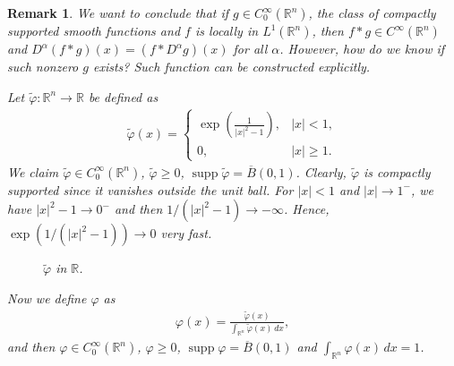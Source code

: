 \documentclass[11pt]{book}
\newtheorem{remark}{Remark}[chapter]
\theoremstyle{definition}
\numberwithin{equation}{chapter}
\begin{document}
\begin{remark}\label{remark_45}
We want to conclude that if $g \in C^\infty_0(\mathbb{R}^n)$, the class of compactly supported smooth functions and $f$ is locally in $L^1(\mathbb{R}^n)$, then $f*g \in C^\infty(\mathbb{R}^n)$ and $D^{\alpha}(f*g)(x) = \left(f*D^{\alpha}g\right)(x)$ for all $\alpha$. However, how do we know if such nonzero $g$ exists? Such function can be constructed explicitly.

Let $\widetilde{\varphi}: \mathbb{R}^n \to \mathbb{R}$ be defined as
\begin{align*}
    \widetilde{\varphi}(x) = \begin{cases}
        \exp\left(\frac{1}{\left|x\right|^2 - 1}\right), & \left|x\right| < 1, \\
        0, & \left|x\right| \geq 1.
    \end{cases}
\end{align*}
We claim $\widetilde{\varphi} \in C^\infty_0(\mathbb{R}^n)$, $\widetilde{\varphi} \geq 0$, $\operatorname{supp} \widetilde{\varphi} = \overline{B}(0,1)$. Clearly, $\widetilde{\varphi}$ is compactly supported since it vanishes outside the unit ball. For $\left|x\right| < 1$ and $\left|x\right| \to 1^-$, we have $\left|x\right|^2 - 1 \to 0^{-}$ and then $1/(\left|x\right|^2 - 1) \to -\infty$. Hence, $\exp(1/(\left|x\right|^2 - 1)) \to 0$ very fast.
\begin{figure}[H]
    \centering
    \caption{$\widetilde{\varphi}$ in $\mathbb{R}$.}
    \label{compactly_support_function_1}
\end{figure}

Now we define $\varphi$ as
\begin{align*}
    \varphi(x) = \frac{\widetilde{\varphi}(x)}{\int_{\mathbb{R}^n}\widetilde{\varphi}(x)\,dx},
\end{align*}
and then $\varphi \in C^\infty_0(\mathbb{R}^n)$, $\varphi \geq 0$, $\operatorname{supp} \varphi = \overline{B}(0,1)$ and $\int_{\mathbb{R}^n}\varphi(x)\,dx = 1$.


\end{remark}
\end{document}
